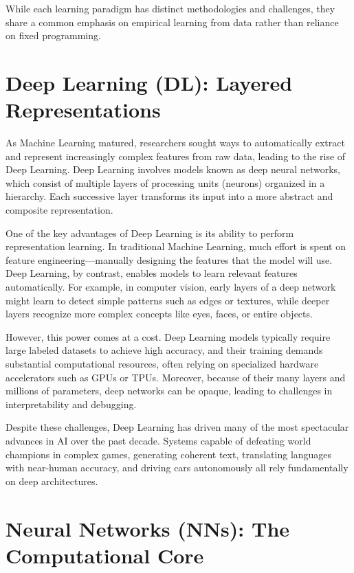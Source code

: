 \documentclass[openany]{book}
\begin{document}
While each learning paradigm has distinct methodologies and challenges, they 
share a common emphasis on empirical learning from data rather than reliance on 
fixed programming.

\section{Deep Learning (DL): Layered Representations}

As Machine Learning matured, researchers sought ways to automatically extract 
and represent increasingly complex features from raw data, leading to the rise 
of Deep Learning. Deep Learning involves models known as deep neural networks, 
which consist of multiple layers of processing units (neurons) organized in a 
hierarchy. Each successive layer transforms its input into a more abstract and 
composite representation.

One of the key advantages of Deep Learning is its ability to perform 
representation learning. In traditional Machine Learning, much effort is spent 
on feature engineering—manually designing the features that the model will use. 
Deep Learning, by contrast, enables models to learn relevant features 
automatically. For example, in computer vision, early layers of a deep network 
might learn to detect simple patterns such as edges or textures, while deeper 
layers recognize more complex concepts like eyes, faces, or entire objects.

However, this power comes at a cost. Deep Learning models typically require 
large labeled datasets to achieve high accuracy, and their training demands 
substantial computational resources, often relying on specialized hardware 
accelerators such as GPUs or TPUs. Moreover, because of their many layers and 
millions of parameters, deep networks can be opaque, leading to challenges in 
interpretability and debugging.

Despite these challenges, Deep Learning has driven many of the most spectacular 
advances in AI over the past decade. Systems capable of defeating world 
champions in complex games, generating coherent text, translating languages with
near-human accuracy, and driving cars autonomously all rely fundamentally on 
deep architectures.

\section{Neural Networks (NNs): The Computational Core}
\end{document}
